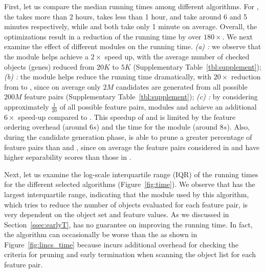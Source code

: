 First, let us compare the median running times among different algorithms. For \msig, the \baseline takes more than 2 hours, \earlyOrder takes less than 1 hour, \samp and \sampOpt take around 6 and 5 minutes respectively, while \horiz and \vertic both take only 1 minute on average. Overall, the optimizations result in a reduction of the running time by over $180\times$. We next examine the effect of different modules on the running time. {\em (a) \earlyT:} we observe that the \earlyT module helps achieve a $2\times$ speed up, with the average number of checked objects (genes) reduced from $20K$ to $5K$ (Supplementary Table~\ref{tbl:supplement}); {\em (b) \sampling:} the \sampling module helps reduce the running time dramatically, with $20\times$ reduction from \baseline to \sampOpt, since on average only $2M$ candidates are generated from all possible $200M$ feature pairs (Supplementary Table~\ref{tbl:supplement}); {\em (c) \traversal:} by considering approximately $\frac{1}{20}$ of all possible feature pairs,  modules \horiz and \vertic achieve an additional $6\times$ speed-up compared to \sampOpt. This speedup of \horiz and \vertic is limited by the feature ordering overhead (around $6s$) and the time for the \trans module (around $8s$). Also, during the candidate generation phase, \sampOpt is able to prune a greater percentage of feature pairs than \horiz and \vertic, since on average the feature pairs considered in \horiz and \vertic have higher separability scores than those in \sampOpt.

Next, let us examine the log-scale interquartile range (IQR) of the running times for the different selected algorithms (Figure~\ref{fig:time}). We observe that \earlyOrder has the largest interquartile range, indicating that the \earlyT module used by this algorithm, which tries to reduce the number of objects evaluated for each feature pair, is very dependent on the object set and feature values. As we discussed in Section~\ref{ssec:earlyT}, \earlyT has no guarantee on improving the running time. In fact, the algorithm can occasionally be worse than the \baseline as shown in Figure~\ref{fig:lincs_time} because \earlyT incurs additional overhead for checking the criteria for pruning and early termination when scanning the object list for each feature pair.

